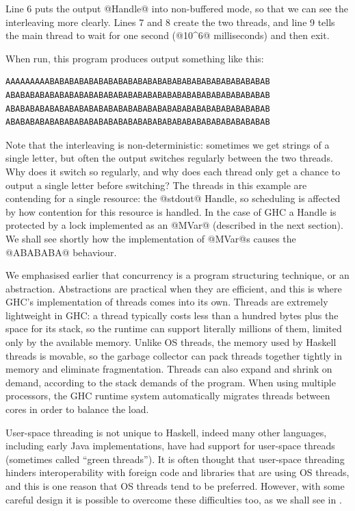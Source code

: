 \noindent Line 6 puts the output @Handle@ into non-buffered mode, so
that we can see the interleaving more clearly.  Lines 7 and 8 create
the two threads, and line 9 tells the main thread to wait for one
second (@10^6@ milliseconds) and then exit.

When run, this program produces output something like this:

\begin{verbatim}
AAAAAAAAABABABABABABABABABABABABABABABABABABABABABABAB
ABABABABABABABABABABABABABABABABABABABABABABABABABABAB
ABABABABABABABABABABABABABABABABABABABABABABABABABABAB
ABABABABABABABABABABABABABABABABABABABABABABABABABABAB
\end{verbatim}

\noindent Note that the interleaving is non-deterministic: sometimes we get
strings of a single letter, but often the output switches regularly
between the two threads.  Why does it switch so regularly, and why
does each thread only get a chance to output a single letter before
switching?  The threads in this example are contending for a single
resource: the @stdout@ Handle, so scheduling is affected by how
contention for this resource is handled.  In the case of GHC a Handle
is protected by a lock implemented as an @MVar@ (described in the next
section).  We shall see shortly how the implementation of @MVar@s
causes the @ABABABA@ behaviour.

We emphasised earlier that concurrency is a program structuring
technique, or an abstraction.  Abstractions are practical when they
are efficient, and this is where GHC's implementation of threads comes
into its own.  Threads are extremely lightweight in GHC: a thread
typically costs less than a hundred bytes plus the space for its
stack, so the runtime can support literally millions of them, limited
only by the available memory.  Unlike OS threads, the memory used by
Haskell threads is movable, so the garbage collector can pack threads
together tightly in memory and eliminate fragmentation.  Threads can
also expand and shrink on demand, according to the stack demands of
the program.  When using multiple processors, the GHC runtime system
automatically migrates threads between cores in order to balance the
load.

User-space threading is not unique to Haskell, indeed many other
languages, including early Java implementations, have had support for
user-space threads (sometimes called ``green threads'').  It is often
thought that user-space threading hinders interoperability with
foreign code and libraries that are using OS threads, and this is one
reason that OS threads tend to be preferred.  However, with some
careful design it is possible to overcome these difficulties too, as
we shall see in .

